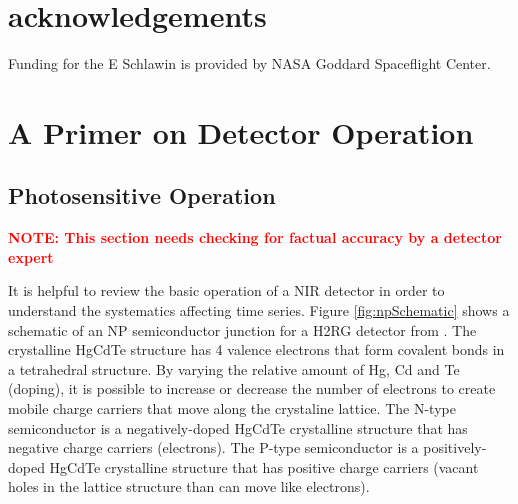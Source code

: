 \documentclass[]{aastex62}
\begin{document}
\acknowledgments

\section*{acknowledgements}
Funding for the E Schlawin is provided by NASA Goddard Spaceflight Center.


\appendix


\section{A Primer on Detector Operation}\label{sec:detectorPrimer}

\subsection{Photosensitive Operation}
\textcolor{red}{\textbf{NOTE: This section needs checking for factual accuracy by a detector expert}}

It is helpful to review the basic operation of a NIR detector \citep[e.g.][]{rieke2007irDetectorReview} in order to understand the systematics affecting time series.
Figure \ref{fig:npSchematic} shows a schematic of an NP semiconductor junction for a H2RG detector from \citet{smith2008imgPersistence}.
The crystalline HgCdTe structure has 4 valence electrons that form covalent bonds in a tetrahedral structure.
By varying the relative amount of Hg, Cd and Te (doping), it is possible to increase or decrease the number of electrons to create mobile charge carriers that move along the crystaline lattice.
The N-type semiconductor is a negatively-doped HgCdTe crystalline structure that has negative charge carriers (electrons).
The P-type semiconductor is a positively-doped HgCdTe crystalline structure that has positive charge carriers (vacant holes in the lattice structure than can move like electrons).
\end{document}
